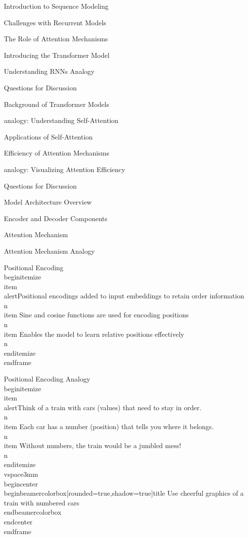\documentclass{beamer}
\begin{document}
\begin{frame}[]{Introduction to Sequence Modeling}
\begin{frame}[]{Challenges with Recurrent Models}
\begin{frame}[]{The Role of Attention Mechanisms}
\begin{frame}[]{Introducing the Transformer Model}
\begin{frame}[plain]{Understanding RNNs Analogy}
\begin{frame}[]{Questions for Discussion}
\begin{frame}[]{Background of Transformer Models}
\begin{frame}[plain]{analogy: Understanding Self-Attention}
\begin{frame}[]{Applications of Self-Attention}
\begin{frame}[]{Efficiency of Attention Mechanisms}
\begin{frame}[plain]{analogy: Visualizing Attention Efficiency}
\begin{frame}[]{Questions for Discussion}
\begin{frame}[]{Model Architecture Overview}
\begin{frame}[]{Encoder and Decoder Components}
\begin{frame}[]{Attention Mechanism}
\begin{frame}[plain]{Attention Mechanism Analogy}
\begingroup
{}\n{}\n\begin{frame}[]{Positional Encoding}\n\\begin{itemize}
\\item \\alert{Positional encodings added to input embeddings to retain order information}\\n\\item Sine and cosine functions are used for encoding positions\\n\\item Enables the model to learn relative positions effectively\\n\\end{itemize}
\\end{frame}

\endgroup

\begingroup
{}\n{}\n\begin{frame}[plain]{Positional Encoding Analogy}\n\\begin{itemize}
\\item \\alert{Think of a train with cars (values) that need to stay in order.}\\n\\item Each car has a number (position) that tells you where it belongs.\\n\\item Without numbers, the train would be a jumbled mess!\\n\\end{itemize}
\\vspace{3mm}
\\begin{center}
\\begin{beamercolorbox}[rounded=true,shadow=true]{title}
Use cheerful graphics of a train with numbered cars
\\end{beamercolorbox}
\\end{center}
\\end{frame}

\endgroup


\end{frame}
\end{frame}
\end{frame}
\end{frame}
\end{frame}
\end{frame}
\end{frame}
\end{frame}
\end{frame}
\end{frame}
\end{frame}
\end{frame}
\end{frame}
\end{frame}
\end{frame}
\end{frame}
\end{frame}
\end{frame}
\end{document}
